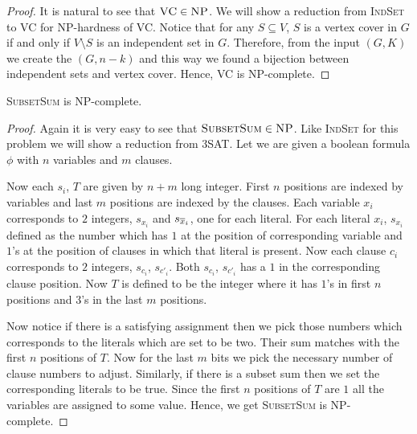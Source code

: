\begin{proof}
It is natural to see that $\textsc{VC}\in\textsc{NP}$. We will show a reduction from \textsc{IndSet} to \textsc{VC} for \textsc{NP}-hardness of \textsc{VC}. Notice that for any $S\subseteq V$, $S$ is a vertex cover in $G$ if and only if $V\setminus S$ is an independent set in $G$. Therefore, from the input $(G,K)$ we create the $(G,n-k)$ and this way we found a bijection between independent sets and vertex cover. Hence, \textsc{VC} is \textsc{NP}-complete.
\end{proof}
\begin{Theorem}{}{}
\textsc{SubsetSum} is \textsc{NP}-complete. 
\end{Theorem}
\begin{proof}
Again it is very easy to see that $\textsc{SubsetSum}\in\textsc{NP}$. Like \textsc{IndSet} for this problem we will show a reduction from \textsc{3SAT}. Let we are given a boolean formula $\phi$ with $n$ variables and $m$ clauses.

Now each $s_i$, $T$ are given by $n+m$ long integer. First $n$ positions are indexed by variables and last $m$ positions are indexed by the clauses. Each variable $x_i$ corresponds to $2$ integers, $s_{x_i}$ and $s_{\overline{x}_i}$, one for each literal. For each literal $x_i$,  $s_{x_i}$ defined as the number which has $1$ at the position of corresponding variable and $1$'s at the position of clauses in which that literal is present. Now each clause $c_i$ corresponds to $2$ integers, $s_{c_i}$, $s_{c'_i}$. Both $s_{c_i}$, $s_{c'_i}$ has a $1$ in the corresponding clause position. Now $T$ is defined to be the integer where it has $1$'s in first $n$ positions and $3$'s in the last $m$ positions.

Now notice if there is a satisfying assignment then we pick those numbers which corresponds to the literals which are set to be two. Their sum matches with the first $n$ positions of $T$. Now for the last $m$ bits we pick the necessary number of clause numbers to adjust. Similarly, if there is a subset sum then we set the corresponding literals to be true. Since the first $n$ positions of $T$ are $1$ all the variables are assigned to some value. Hence, we get \textsc{SubsetSum} is \textsc{NP}-complete. 
\end{proof}
